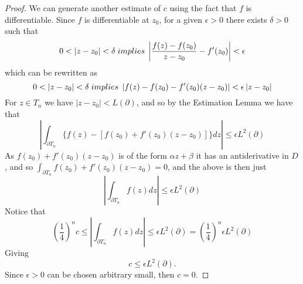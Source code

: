 \documentclass{article}
\begin{document}
\begin{proof}
We can generate another estimate of $c$ using the fact that $f$ is differentiable. Since $f$ is differentiable at $z_0$, for a given $\epsilon > 0$ there exists $\delta > 0$ such that
\begin{equation*}
0 < \left|z - z_0\right| < \delta \hspace{0.1cm} implies \hspace{0.1cm} \left| \frac{f(z) - f(z_0)}{z - z_0} - f'(z_0)\right| < \epsilon
\end{equation*}
which can be rewritten as
\begin{equation*}
0 < \left|z - z_0\right| < \delta \hspace{0.1cm} implies \hspace{0.1cm} \left|f(z) - f(z_0) - f'(z_0)(z - z_0)\right| < \epsilon \left|z -z_0\right|
\end{equation*}
For $z \in T_n$ we have $\left|z - z_0\right| < L(\partial)$, and so by the Estimation Lemma we have that
\begin{equation*}
\left| \int_{\partial T_n} \{f(z) - [f(z_0) + f'(z_0)(z - z_0)]\}dz \right| \leq \epsilon L^2(\partial)
\end{equation*}
As $f(z_0) + f'(z_0)(z - z_0)$ is of the form $\alpha z + \beta$ it has an antiderivative in $D$, and so $\int_{\partial T_n} f(z_0) + f'(z_0)(z - z_0) = 0$, and the above is then just
\begin{equation*}
\left| \int_{\partial T_n} f(z)dz \right| \leq \epsilon L^2(\partial)
\end{equation*}
Notice that 
\begin{equation*}
(\frac{1}{4})^n c \leq \left| \int_{\partial T_n} f(z)dz\right| \leq \epsilon L^2(\partial) = (\frac{1}{4})^n \epsilon L^2(\partial)
\end{equation*}
Giving
\begin{equation*}
c \leq \epsilon L^2(\partial).
\end{equation*}
Since $\epsilon > 0$ can be chosen arbitrary small, then $c = 0$.
\end{proof}
\end{document}
